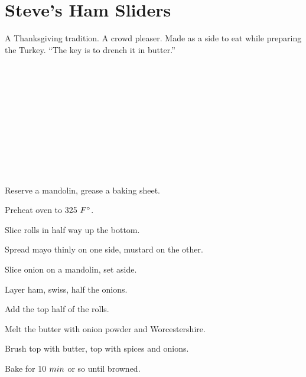 \section[Ham Sliders]{Steve's Ham Sliders}

\begin{recipestats}[
        servings=,
        preptime=30~$\min$,
        bakingtime=15~$\min$,
        source=Steven Teresi,
    ]
\end{recipestats}

\begin{recipeabstract}
    A Thanksgiving tradition.
    A crowd pleaser.
    Made as a side to eat while preparing the Turkey.
    ``The key is to drench it in butter.''
\end{recipeabstract}

\begin{ingredientcolumns}
    \begin{ingredientblock}
        \\
        \\
        \\
        \\
        \\
    \end{ingredientblock}

    \bigskip
    \begin{ingredientblock}
        \\
        \\
        \\
        \\
    \end{ingredientblock}
\end{ingredientcolumns}

\begin{preparation}
\item Reserve a mandolin, grease a baking sheet.
\item Preheat oven to 325 $\Fahrenheit$.
\item Slice rolls in half way up the bottom.
\item Spread mayo thinly on one side, mustard on the other.
\item Slice onion on a mandolin, set aside.
\item Layer ham, swiss, half the onions.
\item Add the top half of the rolls.
\item Melt the butter with onion powder and Worcestershire.
\item Brush top with butter, top with spices and onions.
\item Bake for 10 $\minute$ or so until browned.
\end{preparation}

\recipeend%
